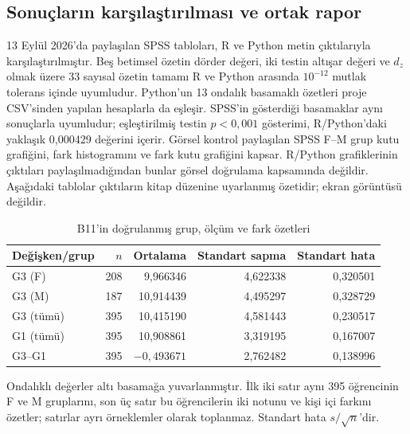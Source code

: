 \subsection{Sonuçların karşılaştırılması ve ortak rapor}
13 Eylül 2026'da paylaşılan SPSS tabloları, R ve Python metin
çıktılarıyla karşılaştırılmıştır. Beş betimsel özetin dörder değeri,
iki testin altışar değeri ve $d_z$ olmak üzere 33 sayısal özetin
tamamı R ve Python arasında $10^{-12}$ mutlak tolerans içinde
uyumludur. Python'un 13 ondalık basamaklı özetleri proje CSV'sinden
yapılan hesaplarla da eşleşir. SPSS'in gösterdiği basamaklar aynı
sonuçlarla uyumludur; eşleştirilmiş testin $p<0{,}001$ gösterimi,
R/Python'daki yaklaşık 0,000429 değerini içerir.
Görsel kontrol paylaşılan SPSS F--M grup kutu grafiğini, fark
histogramını ve fark kutu grafiğini kapsar. R/Python grafiklerinin
çıktıları paylaşılmadığından bunlar görsel doğrulama kapsamında
değildir. Aşağıdaki tablolar çıktıların kitap
düzenine uyarlanmış özetidir; ekran görüntüsü değildir.

\begin{table}[H]
\centering
\caption{B11'in doğrulanmış grup, ölçüm ve fark özetleri}
\label{tab:b11-dogrulanmis-betimsel}
\begin{tabular}{@{}lrrrr@{}}
\toprule
Değişken/grup & $n$ & Ortalama & Standart sapma & Standart hata \\
\midrule
G3 (F) & 208 & 9,966346 & 4,622338 & 0,320501 \\
G3 (M) & 187 & 10,914439 & 4,495297 & 0,328729 \\
\midrule
G3 (tümü) & 395 & 10,415190 & 4,581443 & 0,230517 \\
G1 (tümü) & 395 & 10,908861 & 3,319195 & 0,167007 \\
G3--G1 & 395 & $-0{,}493671$ & 2,762482 & 0,138996 \\
\bottomrule
\end{tabular}
\par\smallskip
{\footnotesize Ondalıklı değerler altı basamağa yuvarlanmıştır.
İlk iki satır aynı 395 öğrencinin F ve M gruplarını, son üç satır
bu öğrencilerin iki notunu ve kişi içi farkını özetler; satırlar
ayrı örneklemler olarak toplanmaz. Standart hata $s/\sqrt{n}$'dir.\par}
\end{table}

